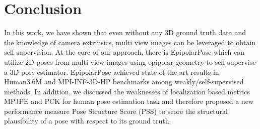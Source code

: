 \documentclass[10pt,twocolumn,letterpaper]{article}
\begin{document}
\section{Conclusion}
In this work, we have shown that even without any 3D ground truth data and the knowledge of camera extrinsics, multi view images can be leveraged to obtain self supervision. At the core of our approach, there is EpipolarPose which can utilize 2D poses from multi-view images using epipolar geometry to self-supervise a 3D pose estimator. EpipolarPose achieved state-of-the-art results in Human3.6M and MPI-INF-3D-HP benchmarks among weakly/self-supervised methods. In addition, we discussed the weaknesses of localization based metrics \ie MPJPE and PCK for human pose estimation task and therefore proposed a new performance measure Pose Structure Score (PSS) to score the structural plausibility of a pose with respect to its ground truth.

{\small


}
\end{document}
